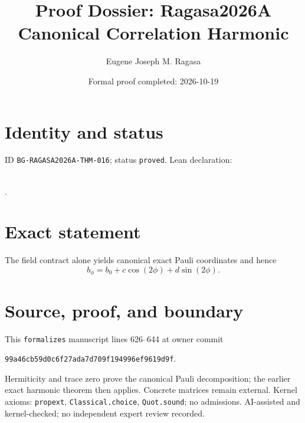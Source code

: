 \documentclass[11pt]{article}
\title{Proof Dossier: Ragasa2026A Canonical Correlation Harmonic}\author{Eugene Joseph M. Ragasa}\date{Formal proof completed: 2026-10-19}
\begin{document}
\maketitle
\section{Identity and status}
ID \texttt{BG-RAGASA2026A-THM-016}; status \texttt{proved}. Lean declaration:
\par{}\\
{\tiny{}}.
\section{Exact statement}
The field contract alone yields canonical exact Pauli coordinates and hence
\[b_\phi=b_0+c\cos(2\phi)+d\sin(2\phi).\]
\section{Source, proof, and boundary}
This \texttt{formalizes} manuscript lines 626--644 at owner commit
\begin{center}\small\texttt{99a46cb59d0c6f27ada7d709f194996ef9619d9f}.\end{center}
Hermiticity and trace zero prove the canonical Pauli decomposition; the earlier exact
harmonic theorem then applies. Concrete matrices remain external. Kernel axioms:
\texttt{propext}, \texttt{Classical.choice}, \texttt{Quot.sound}; no admissions.
AI-assisted and kernel-checked; no independent expert review recorded.
\end{document}

